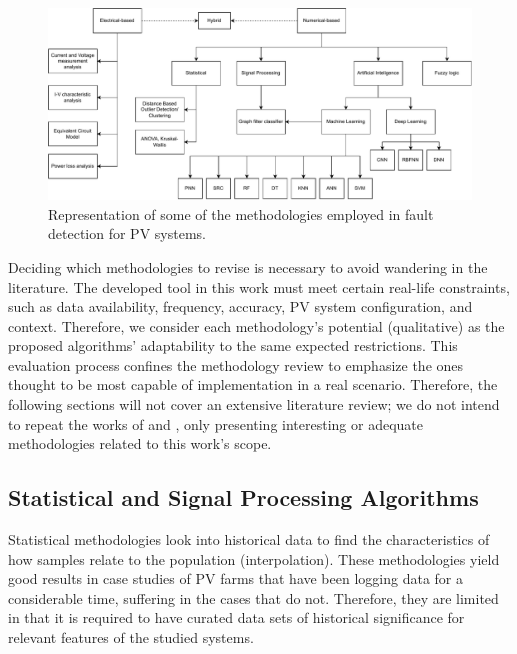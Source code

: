 \begin{figure}[h]
    \centering
    \includegraphics[width=15cm]{figures/chapter2/techniques.drawio.pdf} \caption{Representation of some of the methodologies employed in fault detection for PV systems.}
    \label{fig:techniques}
\end{figure}

Deciding which methodologies to revise is necessary to avoid wandering in the literature. The developed tool in this work must meet certain real-life constraints, such as data availability, frequency, accuracy, PV system configuration, and context. Therefore, we consider each methodology's potential (qualitative) as the proposed algorithms' adaptability to the same expected restrictions. This evaluation process confines the methodology review to emphasize the ones thought to be most capable of implementation in a real scenario. Therefore, the following sections will not cover an extensive literature review; we do not intend to repeat the works of \cite{Hong2022} and \cite{Livera2019}, only presenting interesting or adequate methodologies related to this work's scope.

\subsection{Statistical and Signal Processing Algorithms}

Statistical methodologies look into historical data to find the characteristics of how samples relate to the population (interpolation). These methodologies yield good results in case studies of PV farms that have been logging data for a considerable time, suffering in the cases that do not. Therefore, they are limited in that it is required to have curated data sets of historical significance for relevant features of the studied systems.

